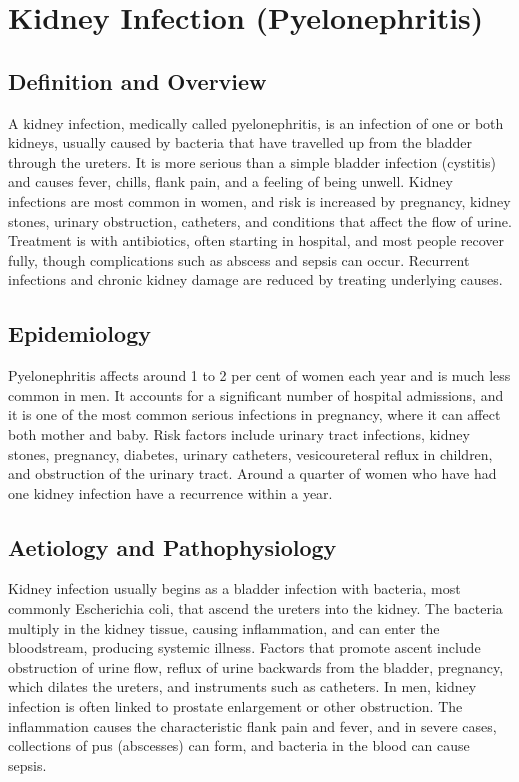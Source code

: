 \chapter{Kidney Infection (Pyelonephritis)}

\section*{Definition and Overview}
A kidney infection, medically called pyelonephritis, is an infection of one or both kidneys, usually caused by bacteria that have travelled up from the bladder through the ureters. It is more serious than a simple bladder infection (cystitis) and causes fever, chills, flank pain, and a feeling of being unwell. Kidney infections are most common in women, and risk is increased by pregnancy, kidney stones, urinary obstruction, catheters, and conditions that affect the flow of urine. Treatment is with antibiotics, often starting in hospital, and most people recover fully, though complications such as abscess and sepsis can occur. Recurrent infections and chronic kidney damage are reduced by treating underlying causes.

\section*{Epidemiology}
Pyelonephritis affects around 1 to 2 per cent of women each year and is much less common in men. It accounts for a significant number of hospital admissions, and it is one of the most common serious infections in pregnancy, where it can affect both mother and baby. Risk factors include urinary tract infections, kidney stones, pregnancy, diabetes, urinary catheters, vesicoureteral reflux in children, and obstruction of the urinary tract. Around a quarter of women who have had one kidney infection have a recurrence within a year.

\section*{Aetiology and Pathophysiology}
Kidney infection usually begins as a bladder infection with bacteria, most commonly Escherichia coli, that ascend the ureters into the kidney. The bacteria multiply in the kidney tissue, causing inflammation, and can enter the bloodstream, producing systemic illness. Factors that promote ascent include obstruction of urine flow, reflux of urine backwards from the bladder, pregnancy, which dilates the ureters, and instruments such as catheters. In men, kidney infection is often linked to prostate enlargement or other obstruction. The inflammation causes the characteristic flank pain and fever, and in severe cases, collections of pus (abscesses) can form, and bacteria in the blood can cause sepsis.

